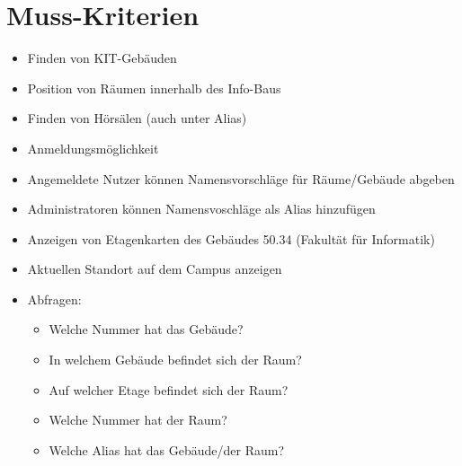 \section{Muss-Kriterien}

\begin{itemize}

    \item Finden von KIT-Gebäuden
    \item Position von Räumen innerhalb des Info-Baus
    \item Finden von Hörsälen (auch unter Alias)
    \item Anmeldungsmöglichkeit
    \item Angemeldete Nutzer können Namensvorschläge für Räume/Gebäude abgeben
    \item Administratoren können Namensvoschläge als Alias hinzufügen
    \item Anzeigen von Etagenkarten des Gebäudes 50.34 (Fakultät für Informatik)
    \item Aktuellen Standort auf dem Campus anzeigen
    \item Abfragen:
        \begin{itemize}
            \item Welche Nummer hat das Gebäude?
            \item In welchem Gebäude befindet sich der Raum?
            \item Auf welcher Etage befindet sich der Raum?
            \item Welche Nummer hat der Raum?
            \item Welche Alias hat das Gebäude/der Raum?
        \end{itemize}


\end{itemize}
